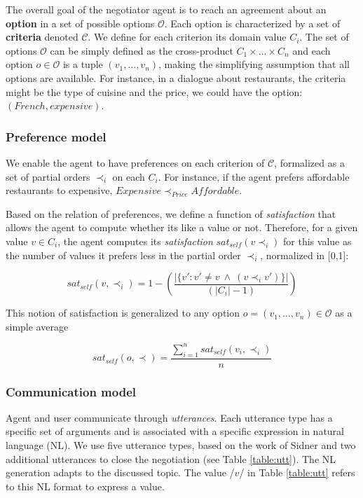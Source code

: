 \documentclass[runningheads,a4paper]{llncs}
\begin{document}
	The overall goal of the negotiator agent is to reach an agreement about an \textbf{option} in a set of possible options $\mathcal{O}$. 
	Each option is characterized by a set of \textbf{criteria} denoted $\mathcal{C}$. We define for each criterion its domain value $C_i$.
	The set of options $\mathcal{O}$ can be simply defined as the cross-product $C_1\times\ldots\times C_n$ and each option $o\in\mathcal{O}$ is a tuple $(v_1,\ldots,v_n)$, making the simplifying assumption that all options are available. For instance, in a dialogue about restaurants, the criteria might be the type of cuisine and the price, we could have the option: $(French,expensive)$.
	
	\subsubsection{Preference model} 
	We enable the agent to have preferences on each criterion of $\mathcal{C}$, formalized as a set of partial orders $\prec_i$ on each $C_i$. For instance, if the agent prefers affordable restaurants to expensive, $Expensive\prec_{Price}Affordable$.
	
	Based on the relation of preferences, we define a function of \emph{satisfaction} that allows the agent to compute whether its like a value or not. Therefore, for a given value $v\in C_i$, the agent computes its \emph{satisfaction} $sat_{self}(v \prec_i)$ for this value as the number of values it prefers less in the partial order $\prec_i$, normalized in [0,1]:

	\begin{equation}
	sat_{self}(v, \prec_i) =	1 - \left( \frac{|\{v' : v' \neq v \  \wedge \ (v \prec_i v')\}| }{( |C_i| - 1 )}\right)
	\end{equation}
	
	This notion of satisfaction is generalized to any option $o= (v_1, \ldots, v_n)\in \mathcal{O}$ as a simple average

	\begin{equation}
	sat_{self}(o, \prec) = \frac{\sum_{i=1}^{n} sat_{self}(v_i, \prec_i) }{n}
	\end{equation}
	
	
	\subsubsection{Communication model}
	\label{Comm}
	Agent and user communicate through \emph{utterances}. Each utterance type has a specific set of arguments and is associated with a specific expression in natural language (NL). We use five utterance types, based on the work of Sidner \cite{sidner1994artificial} and two additional utterances to close the negotiation (see Table \ref{table:utt}). The NL generation adapts to the discussed topic. The value /$v$/ in Table \ref{table:utt} refers to this NL format to express a value.
	
\end{document}
